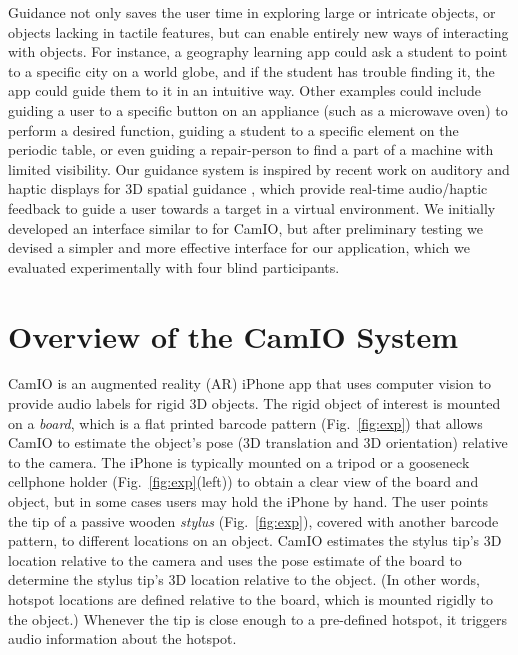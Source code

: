 \documentclass[runningheads]{res/templates/llncs}
\begin{document}
Guidance not only saves the user time in exploring large or intricate objects, or objects lacking in tactile features, but can enable entirely new ways of interacting with objects. 
For instance, a geography learning app could ask a student to point to a specific city on a world globe, and if the student has trouble finding it, the app could guide them to it in an intuitive way. 
Other examples could include guiding a user to a specific button on an appliance (such as a microwave oven) to perform a desired function, guiding a student to a specific element on the periodic table, or even guiding a repair-person to find a part of a machine with limited visibility. 
Our guidance system is inspired by recent work on auditory and haptic displays for 3D spatial guidance \cite{mayAuditoryDisplaysFacilitate2019,guezou-philippePrototypingEvaluatingSensory2018,miesenberger_augmented_2018}, which provide real-time audio/haptic feedback to guide a user towards a target in a virtual environment. 
We initially developed an interface similar to \cite{mayAuditoryDisplaysFacilitate2019} for CamIO, but after preliminary testing we devised a simpler and more effective interface for our application, which we evaluated experimentally with four blind participants.

\hypertarget{overview}{%
\section{Overview of the CamIO System}\label{overview}}

CamIO is an augmented reality (AR) iPhone app that uses computer vision
to provide audio labels for rigid 3D objects. The rigid object of
interest is mounted on a {\em board}, which is a flat printed barcode pattern
(Fig.~\ref{fig:exp}) that allows CamIO to estimate the object's pose (3D
translation and 3D orientation) relative to the camera. The iPhone is
typically mounted on a tripod or a gooseneck cellphone holder
(Fig.~\ref{fig:exp}(left)) to obtain a clear view of the board and object, but in
some cases \cite{coughlanTowardsAccessibleAudioLabeling2020} users may
hold the iPhone by hand. The user points the tip of a passive wooden
{\em stylus} (Fig.~\ref{fig:exp}), covered with another barcode pattern, to different
locations on an object. CamIO estimates the stylus tip's 3D location
relative to the camera and uses the pose estimate of the board to
determine the stylus tip's 3D location relative to the object. (In other words, hotspot locations are
defined relative to the board, which is mounted rigidly to the object.) Whenever
the tip is close enough to a pre-defined hotspot, it triggers audio
information about the hotspot. 
\end{document}
